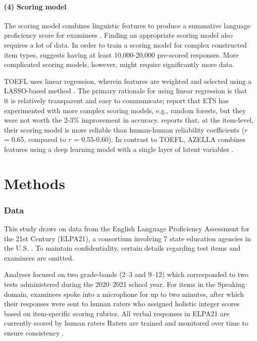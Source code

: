 \documentclass [PhD] {uclathes}
\begin{document}
\subsubsection{(4) Scoring model}

The scoring model combines linguistic features to produce a summative language proficiency score for examinees \citep{loukina2019scoring}. Finding an appropriate scoring model also requires a lot of data. In order to train a scoring model for complex constructed item types, \citet{zechner2019summary} suggests having at least 10,000-20,000 pre-scored responses. More complicated scoring models, however, might require significantly more data.

TOEFL uses linear regression, wherein features are weighted and selected using a LASSO-based method \citep{loukina2015feature}. The primary rationale for using linear regression is that it is relatively transparent and easy to communicate; \citet{loukina2019scoring} report that ETS has experimented with more complex scoring models, e.g., random forests, but they were not worth the 2-3\% improvement in accuracy. \citet{zechner2019summary} reports that, at the item-level, their scoring model is more reliable than human-human reliability coefficients ($r$ = 0.65, compared to $r$ = 0.55-0.60). In contrast to TOEFL, AZELLA combines features using a deep learning model with a single layer of latent variables \citep{cheng2014automatic}.







\chapter{Methods}

\subsection{Data}

This study draws on data from the English Language Proficiency Assessment for the 21st Century (ELPA21), a consortium involving 7 state education agencies in the U.S. \citep{huang2018english}. To maintain confidentiality, certain details regarding test items and examinees are omitted. 

Analyses focused on two grade-bands (2–3 and 9–12) which corresponded to two tests administered during the 2020–2021 school year. For items in the Speaking domain, examinees spoke into a microphone for up to two minutes, after which their responses were sent to human raters who assigned holistic integer scores based on item-specific scoring rubrics. All verbal responses in ELPA21 are currently scored by human raters Raters are trained and monitored over time to ensure consistency \citep{engelhard2002monitoring}. 
\end{document}

